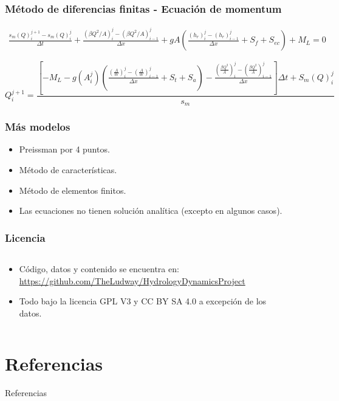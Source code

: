 \documentclass[17pt, t, lualatex]{beamer}
\begin{document}
\begin{frame}
  \frametitle{Método de diferencias finitas - Ecuación de momentum}

  \begin{align*}
  \frac{s_{m} (Q)_{i}^{j+1} - s_{m}(Q)_{i}^{j} }{\Delta t} + \frac{(\beta Q^{2}/A)_{i}^{j} - (\beta Q^{2} /A)_{i-1}^{j} }{\Delta x} + gA \left( \frac{(h_{r})_{i}^{j} - (h_{r})_{i-1}^{j}}{\Delta x} + S_{f} + S_{ec}   \right) + M_{L} = 0   
\end{align*}

  \[
  Q_{i}^{j+1} = \frac{\left[ -M_{L} - g(A_{i}^{j}) \left(\frac{\left(\frac{A}{W}\right)_{i}^{j} - \left(\frac{A}{W}\right)_{i-1}^{j} }{\Delta x} + S_{t} + S_{a}  \right) - \frac{ \left( \frac{\beta Q^{2}}{A} \right)_{i}^{j} - \left( \frac{\beta Q^{2}}{A} \right)_{i-1}^{j}  }{\Delta x}           \right] \Delta t + S_{m} (Q)_{i}^{j}}{s_{m}}
  \]
  
  
\end{frame}


\begin{frame}
  \frametitle{Más modelos}

  \begin{itemize}
    \item Preissman por 4 puntos.
    \item Método de características.
    \item Método de elementos finitos.
    \item Las ecuaciones no tienen solución analítica (excepto en algunos casos).\cite{deaton1999dynamic}
  \end{itemize}
  
\end{frame}


   



\begin{frame}
  \frametitle{Licencia}

  \begin{columns}
    \begin{column}{.5\textwidth}
      \begin{itemize}
        \item Código, datos y contenido se encuentra en: \url{https://github.com/TheLudway/HydrologyDynamicsProject} 
        \item Todo bajo la licencia GPL V3 y CC BY SA 4.0 a excepción de los datos.
      \end{itemize}
    \end{column}

    \begin{column}{.5\textwidth}
      \begin{figure}[ht]
        \centering
        
      \end{figure}
    \end{column}
  \end{columns}

\end{frame}


\section{Referencias}

\insertsectionpage
\begin{frame}[allowframebreaks]{Referencias}
  \printbibliography
\end{frame}


\insertendpage
\end{document}

